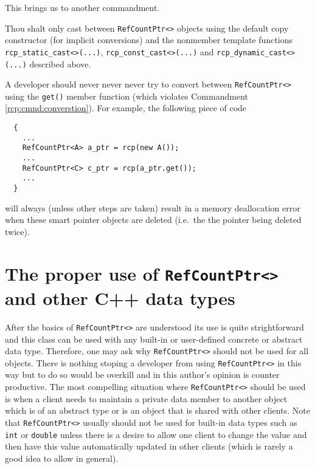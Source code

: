 This brings us to another commandment.

\begin{commandment}\label{rcp:cmnd:converstion}
Thou shalt only cast between {}\texttt{RefCountPtr<>} objects using the
default copy constructor (for implicit conversions) and the nonmember
template functions {}\texttt{rcp\-\_static\-\_cast<>(...)},
{}\texttt{rcp\-\_const\-\_cast<>(...)} and
{}\texttt{rcp\-\_dynamic\-\_cast<>(...)}  described above.
\end{commandment}

A developer should never never never try to convert between
{}\texttt{RefCountPtr<>} using the {}\texttt{get()} member function
(which violates Commandment {}\ref{rcp:cmnd:converstion}).  For
example, the following piece of code

{\scriptsize\begin{verbatim}
  {
    ...
    RefCountPtr<A> a_ptr = rcp(new A());
    ...
    RefCountPtr<C> c_ptr = rcp(a_ptr.get());
    ...
  }
\end{verbatim}}

{}\noindent{} will always (unless other steps are taken) result in a
memory deallocation error when these smart pointer objects are deleted
(i.e.~the the pointer being deleted twice).

%
\section{The proper use of {}\texttt{RefCountPtr<>} and other C++ data types}
%

After the basics of {}\texttt{RefCountPtr<>} are understood its use is
quite strightforward and this class can be used with any built-in or
user-defined concrete or abstract data type.  Therefore, one may ask
why {}\texttt{RefCountPtr<>} should not be used for all objects.
There is nothing stoping a developer from using
{}\texttt{RefCountPtr<>} in this way but to do so would be overkill
and in this author's opinion is counter productive.  The most
compelling situation where {}\texttt{RefCountPtr<>} should be used is
when a client needs to maintain a private data member to another
object which is of an abstract type or is an object that is shared
with other clients.  Note that {}\texttt{RefCountPtr<>} usually should
not be used for built-in data types such as {}\texttt{int} or
{}\texttt{double} unless there is a desire to allow one client to
change the value and then have this value automatically updated in
other clients (which is rarely a good idea to allow in general).

